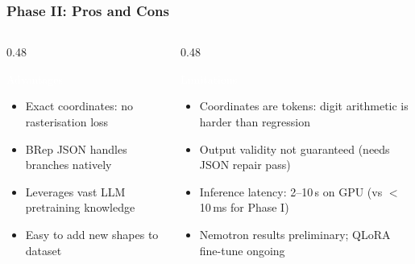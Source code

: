 \begin{frame}[fragile]\frametitle{Phase II: Pros and Cons}
\begin{columns}[t]
  \begin{column}[T]{0.48\linewidth}
  \begin{block}{\textcolor{white}{Advantages}}
    \begin{itemize}
    \item[\tiny$\blacktriangleright$] Exact coordinates: no rasterisation loss
    \item[\tiny$\blacktriangleright$] BRep JSON handles branches natively
    \item[\tiny$\blacktriangleright$] Leverages vast LLM pretraining knowledge
    \item[\tiny$\blacktriangleright$] Easy to add new shapes to dataset
    \end{itemize}
  \end{block}
  \end{column}
  \begin{column}[T]{0.48\linewidth}
  \begin{alertblock}{\textcolor{white}{Limitations}}
    \begin{itemize}
    \item[\tiny$\blacktriangleright$] Coordinates are tokens: digit arithmetic is harder than regression
    \item[\tiny$\blacktriangleright$] Output validity not guaranteed (needs JSON repair pass)
    \item[\tiny$\blacktriangleright$] Inference latency: 2--10\,s on GPU (vs $<$10\,ms for Phase I)
    \item[\tiny$\blacktriangleright$] Nemotron results preliminary; QLoRA fine-tune ongoing
    \end{itemize}
  \end{alertblock}
  \end{column}
\end{columns}
\end{frame}
